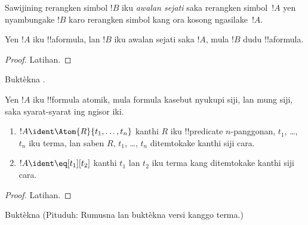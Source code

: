 \documentclass[../../../include/open-logic-section]{subfiles}
\begin{document}
\begin{defn}
Sawijining rerangken simbol $!B$ iku \emph{awalan sejati} saka
rerangken simbol~$!A$ yen nyambungake $!B$ karo rerangken simbol
kang ora kosong ngasilake~$!A$.
\end{defn}

\begin{lem}
Yen $!A$ iku !!a{formula}, lan $!B$ iku awalan sejati saka $!A$,
mula $!B$ dudu !!a{formula}.
\end{lem}

\begin{proof}
Latihan.
\end{proof}

\begin{prob}
Buktèkna .
\end{prob}

\begin{prop}
Yen $!A$ iku !!{formula} atomik, mula formula kasebut nyukupi siji, lan mung
siji, saka syarat-syarat ing ngisor iki.
\begin{enumerate}
\item $!A \ident \Atom{R}{t_1,\dots,t_n}$ kanthi $R$ iku
  !!{predicate} $n$-panggonan, $t_1$, \dots, $t_n$ iku terma, lan
  saben $R$, $t_1$, \dots, $t_n$ ditemtokake kanthi siji cara.
\item $!A \ident \eq[t_1][t_2]$ kanthi $t_1$ lan $t_2$ iku terma
  kang ditemtokake kanthi siji cara.
\end{enumerate}
\end{prop}

\begin{proof}
Latihan.
\end{proof}

\begin{prob}
Buktèkna  (Pituduh:
Rumusna lan buktèkna versi 
kanggo terma.)
\end{prob}
\end{document}
